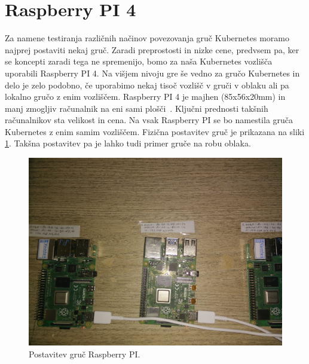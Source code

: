 \documentclass[a4paper, 12pt]{book}
\begin{document}
\section{Raspberry PI 4}
Za namene testiranja različnih načinov povezovanja gruč Kubernetes moramo najprej postaviti nekaj gruč.
Zaradi preprostosti in nizke cene, predvsem pa, ker se koncepti zaradi tega ne spremenijo, bomo za naša Kubernetes vozlišča uporabili Raspberry PI 4.
Na višjem nivoju gre še vedno za gručo Kubernetes in delo je zelo podobno, če uporabimo nekaj tisoč vozlišč v gruči v oblaku ali pa lokalno gručo z enim vozliščem.
Raspberry PI 4 je majhen (85x56x20mm) in manj zmogljiv računalnik na eni sami plošči~\cite{rpi-tech-spec}.
Ključni prednosti takšnih računalnikov sta velikost in cena.
Na vsak Raspberry PI se bo namestila gruča Kubernetes z enim samim vozliščem.
Fizična postavitev gruč je prikazana na sliki \ref{rpi-gruce}.
Takšna postavitev pa je lahko tudi primer gruče na robu oblaka.
\begin{figure}[h]
\begin{center}
\includegraphics[width=1.0\textwidth]{images/postavitev-raspberry.jpg}
\end{center}
\caption{Postavitev gruč Raspberry PI.}
\label{rpi-gruce}
\end{figure}
\end{document}
